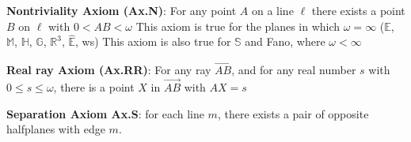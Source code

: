 \documentclass{report}
\begin{document}
    \item \textbf{Nontriviality Axiom (Ax.N)}: For any point $A$ on a line $\ell$ there exists a point $B$ on $\ell$ with $0 < AB < \omega$
        \bigbreak \noindent 
        This axiom is true for the planes in which $\omega = \infty$ ($\mathbb{E}$, $\mathbb{M}$, $\mathbb{H}$, $\mathbb{G}$, $\mathbb{R}^{3}$, $\hat{\mathbb{E}} $, ws)
        \bigbreak \noindent 
        This axiom is also true for $\mathbb{S}$ and Fano, where $\omega < \infty $
     \item \textbf{Real ray Axiom (Ax.RR)}: For any ray $ \overrightarrow{AB}$, and for any real number $s $ with $0 \leq s \leq \omega$, there is a point $X$ in $\overrightarrow{AB}$ with $AX = s$
        \item \textbf{Separation Axiom Ax.S}: for each line $m$, there exists a pair of opposite halfplanes with edge $m$. 



    \pagebreak 
\end{document}
